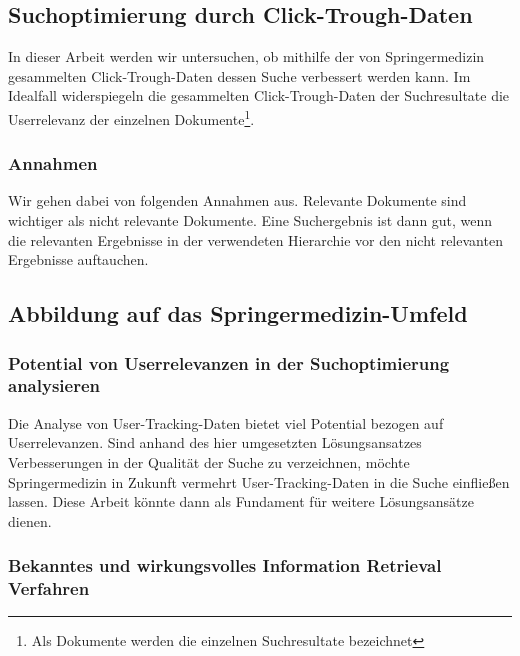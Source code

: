 \subsection{Suchoptimierung durch Click-Trough-Daten}
\label{sec:Einfuehrung:ZielArbeit:Suchoptimierung}

In dieser Arbeit werden wir untersuchen, ob mithilfe der von Springermedizin gesammelten Click-Trough-Daten dessen Suche verbessert werden kann. Im Idealfall widerspiegeln die gesammelten Click-Trough-Daten der Suchresultate die Userrelevanz der einzelnen Dokumente\footnote{Als Dokumente werden die einzelnen Suchresultate bezeichnet}.

\subsubsection{Annahmen}
\label{sec:Einfuehrung:ZielArbeit:Suchoptimierung:Annahmen}

Wir gehen dabei von folgenden Annahmen aus. Relevante Dokumente sind wichtiger als nicht relevante Dokumente. Eine Suchergebnis ist dann gut, wenn die relevanten Ergebnisse in der verwendeten Hierarchie vor den nicht relevanten Ergebnisse auftauchen. 

\subsection{Abbildung auf das Springermedizin-Umfeld}
\label{sec:Einfuehrung:ZielArbeit:AbbildungSpringermedizinUmfeld}

\subsubsection{Potential von Userrelevanzen in der Suchoptimierung analysieren}
\label{sec:Einfuehrung:ZielArbeit:Potential}

Die Analyse von User-Tracking-Daten bietet viel Potential bezogen auf Userrelevanzen. Sind anhand des hier umgesetzten Lösungsansatzes Verbesserungen in der Qualität der Suche zu verzeichnen, möchte Springermedizin in Zukunft vermehrt User-Tracking-Daten in die Suche einfließen lassen. Diese Arbeit könnte dann als Fundament für weitere Lösungsansätze dienen.

\subsubsection{Bekanntes und wirkungsvolles Information Retrieval Verfahren}
\label{sec:Einfuehrung:ZielArbeit:AbbildungSpringermedizinUmfeld:InformationRetrievalVerfahren}


